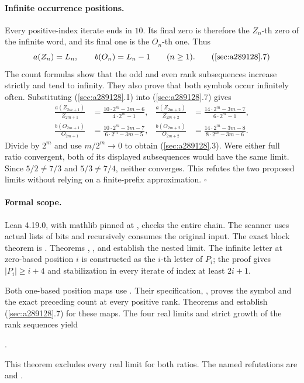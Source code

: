 \documentclass[11pt]{article}
\begin{document}
\paragraph{Infinite occurrence positions.}
Every positive-index iterate ends in $10$. Its final zero is
therefore the $Z_n$-th zero of the infinite word, and its final one
is the $O_n$-th one. Thus
\[
a(Z_n)=L_n,\qquad b(O_n)=L_n-1\qquad(n\ge1).
\tag{\ref{sec:a289128}.7}
\]
The count formulas show that the odd and even rank subsequences
increase strictly and tend to infinity. They also prove that both
symbols occur infinitely often. Substituting
(\ref{sec:a289128}.1) into (\ref{sec:a289128}.7) gives
\[
\begin{aligned}
\frac{a(Z_{2m+1})}{Z_{2m+1}}
 &=\frac{10\cdot2^m-3m-6}{4\cdot2^m-1},&
\frac{a(Z_{2m+2})}{Z_{2m+2}}
 &=\frac{14\cdot2^m-3m-7}{6\cdot2^m-1},\\
\frac{b(O_{2m+1})}{O_{2m+1}}
 &=\frac{10\cdot2^m-3m-7}{6\cdot2^m-3m-5},&
\frac{b(O_{2m+2})}{O_{2m+2}}
 &=\frac{14\cdot2^m-3m-8}{8\cdot2^m-3m-6}.
\end{aligned}
\]
Divide by $2^m$ and use $m/2^m\to0$ to obtain
(\ref{sec:a289128}.3). Were either full ratio convergent, both of
its displayed subsequences would have the same limit. Since
$5/2\ne7/3$ and $5/3\ne7/4$, neither converges. This refutes the
two proposed limits without relying on a finite-prefix
approximation. $\square$

\paragraph{Formal scope.}
Lean 4.19.0, with mathlib pinned at
, checks the entire
chain. The scanner uses actual lists of bits and recursively
consumes the original input. The exact block theorem is
. Theorems
, , and
 establish the nested limit. The
infinite letter at zero-based position $i$ is constructed as the
$i$-th letter of $P_i$; the proof gives $|P_i|\ge i+4$ and
stabilization in every iterate of index at least $2i+1$.

Both one-based position maps use . Their specification,
, proves the symbol and the exact preceding count
at every positive rank. Theorems  and
 establish (\ref{sec:a289128}.7) for these maps.
The four real limits and strict growth of the rank sequences yield
\begin{center}
.
\end{center}
This theorem excludes every real limit for both ratios. The named
refutations are  and
.
\end{document}
